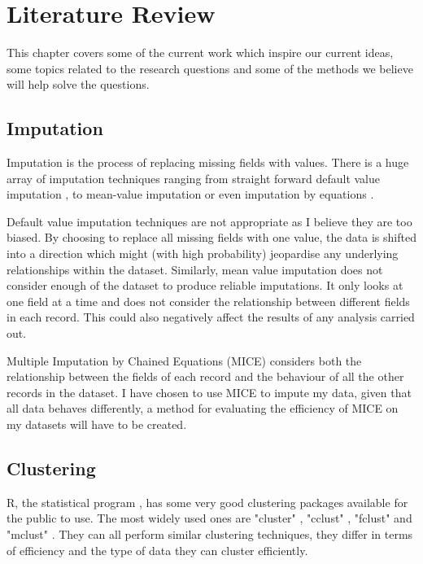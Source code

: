 \documentclass[bsc]{abdnthesis}
\begin{document}
\chapter{Literature Review}
This chapter covers some of the current work which inspire our current ideas, some topics related to the research questions and some of the methods we believe will help solve the questions.
\section{Imputation} %
\label{sec:imputation}
Imputation is the process of replacing missing fields with values\cite{ imp}. There is a huge array of imputation techniques ranging from straight forward default value imputation \cite{ imp-default}, to mean-value imputation \cite{ imp-mean} or even imputation by equations \cite{imp-mi, imp-mice}. 

Default value imputation techniques are not appropriate as I believe they are too biased. By choosing to replace all missing fields with one value, the data is shifted into a direction which might (with high probability) jeopardise any underlying relationships within the dataset. Similarly, mean value imputation does not consider enough of the dataset to produce reliable imputations. It only looks at one field at a time and does not consider the relationship between different fields in each record. This could also negatively affect the results of any analysis carried out. 

Multiple Imputation by Chained Equations (MICE) \cite{imp-mice} considers both the relationship between the fields of each record and the behaviour of all the other records in the dataset. I have chosen to use MICE to impute my data, given that all data behaves differently, a method for evaluating the efficiency of MICE on my datasets will have to be created. 
\section{Clustering} %
\label{sec:clustering}
R, the statistical program \cite{R}, has some very good clustering packages available \cite{ cran} for the public to use. The most widely used ones are "cluster" \cite{clust-cluster}, "cclust" \cite{ clust-cclust}, "fclust" \cite{ clust-fclust} and "mclust" \cite{ clust-mclust}. They can all perform similar clustering techniques, they differ in terms of efficiency and the type of data they can cluster efficiently. 
\end{document}
